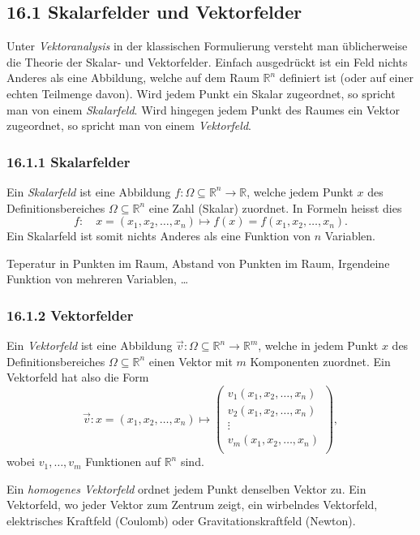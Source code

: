 \documentclass[a4paper,landscape,8pt]{extarticle}
\newcommand{\R}{\mathbb{R}}
\begin{document}
\begin{multicols*}{4}
\begin{warmup}
\subsection{16.1 Skalarfelder und Vektorfelder}

Unter \emph{Vektoranalysis} in der klassischen Formulierung versteht man
üblicherweise die Theorie der Skalar- und Vektorfelder. Einfach ausgedrückt ist
ein Feld nichts Anderes als eine Abbildung, welche auf dem Raum $\R^n$ definiert
ist (oder auf einer echten Teilmenge davon). Wird jedem Punkt ein Skalar
zugeordnet, so spricht man von einem \emph{Skalarfeld}. Wird hingegen jedem
Punkt des Raumes ein Vektor zugeordnet, so spricht man von einem
\emph{Vektorfeld}.

\subsubsection{16.1.1 Skalarfelder}

\Def Ein \emph{Skalarfeld} ist eine Abbildung $f\colon\Omega\subseteq\R^n\to\R$,
welche jedem Punkt $x$ des Definitionsbereiches $\Omega\subseteq\R^n$ eine Zahl
(Skalar) zuordnet. In Formeln heisst dies
\[
f\colon\quad x=(x_1,x_2,\ldots,x_n) \mapsto f(x) = f(x_1,x_2,\ldots,x_n).
\]
Ein Skalarfeld ist somit nichts Anderes als eine Funktion von $n$ Variablen.

\Bsp Teperatur in Punkten im Raum, Abstand von Punkten im Raum, Irgendeine
Funktion von mehreren Variablen, \ldots

\subsubsection{16.1.2 Vektorfelder}

\Def Ein \emph{Vektorfeld} ist eine Abbildung $\vec{v}\colon \Omega\subseteq
\R^n\to\R^m$, welche in jedem Punkt $x$ des Definitionsbereiches
$\Omega\subseteq\R^n$ einen Vektor mit $m$ Komponenten zuordnet. Ein Vektorfeld
hat also die Form
\[
\vec{v}\colon x=(x_1,x_2,\ldots,x_n) \mapsto
\begin{pmatrix}
v_1(x_1,x_2,\ldots,x_n)\\
v_2(x_1,x_2,\ldots,x_n)\\
\vdots\\
v_m(x_1,x_2,\ldots,x_n)\\
\end{pmatrix},
\]
wobei $v_1,\ldots,v_m$ Funktionen auf $\R^n$ sind.

\Bsp Ein \emph{homogenes Vektorfeld} ordnet jedem Punkt denselben Vektor zu. Ein
Vektorfeld, wo jeder Vektor zum Zentrum zeigt, ein wirbelndes Vektorfeld,
elektrisches Kraftfeld (Coulomb) oder Gravitationskraftfeld (Newton).
\end{warmup}


\end{multicols*}
\end{document}
